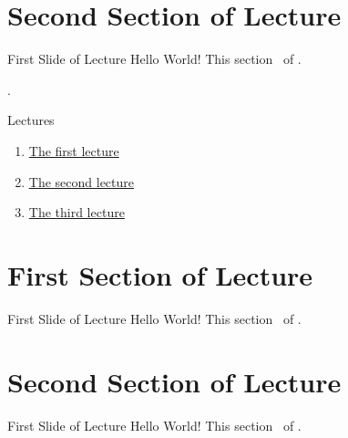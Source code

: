 \documentclass[
	aspectratio=169, %
	8pt, %
]{beamer}
\newcommand{\lectureoverviewslide}{
    \begin{frame}[plain]{\thelecture.~\insertlecture}
        \label{lec:\thelecture}
        \begin{fancycolumns}
            \begin{definition}{Lectures}
                \begin{enumerate}
                    \item \hyperlink{lec:1}{The first lecture}
                    \item \hyperlink{lec:2}{The second lecture}
                    \item \hyperlink{lec:3}{The third lecture}
                \end{enumerate}
            \end{definition}
        \nextcolumn
            \tableofcontents
        \end{fancycolumns}
    \end{frame}
}
\begin{document}
    \section{Second Section of Lecture \thelecture}

    \begin{frame}{First Slide of Lecture \thelecture}
        Hello World! This section \thesection\ of \insertlecture.
    \end{frame}





    \lectureoverviewslide

    \section{First Section of Lecture \thelecture}

    \begin{frame}{First Slide of Lecture \thelecture}
        Hello World! This section \thesection\ of \insertlecture.
    \end{frame}

    \section{Second Section of Lecture \thelecture}

    \begin{frame}{First Slide of Lecture \thelecture}
        Hello World! This section \thesection\ of \insertlecture.
    \end{frame}
\end{document}
